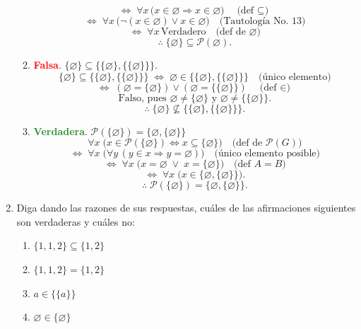 \documentclass[12pt,letterpaper]{exam}
\begin{document}
\begin{enumerate}
\begin{enumerate}[label=\alph*)]
\[\iff\; \forall x\,\big(x\in\varnothing \Rightarrow x\in \varnothing\big)
\quad\text{(def $\subseteq$)}
\]
\[
\iff\; \forall x\,\big(\lnot(x\in\varnothing)\lor x\in \varnothing\big)
\quad\text{(Tautología No.\ 13)}
\]
\[
\iff\; \forall x\,\text{Verdadero}
\quad\text{(def de $\varnothing$)}
\]
\[
\therefore\; \{\varnothing\}\subseteq \mathcal{P}(\varnothing).
\]
\item \textbf{\textcolor{red}{Falsa}}. $\{\varnothing\} \subseteq \{\{\varnothing\}, \{\{\varnothing\}\}\}$.
\[
\{\varnothing\}\subseteq \{\{\varnothing\}, \{\{\varnothing\}\}\}
\;\iff\; \varnothing\in \{\{\varnothing\}, \{\{\varnothing\}\}\} \quad\text{(\'unico elemento)}
\]
\[
\iff\; (\varnothing=\{\varnothing\}) \lor (\varnothing=\{\{\varnothing\}\}) \quad\text{(def $\in$)}
\]
\[
\text{Falso, pues } \varnothing\neq\{\varnothing\} \text{ y } \varnothing\neq\{\{\varnothing\}\}.
\]
\[
\therefore\; \{\varnothing\}\not\subseteq \{\{\varnothing\}, \{\{\varnothing\}\}\}.
\]
\item \textbf{\textcolor{ForestGreen}{Verdadera}}. $\mathcal{P}(\{\varnothing\}) = \{\varnothing, \{\varnothing\}\}$
\[
\forall x\;\Big(x\in\mathcal{P}(\{\varnothing\})
\iff x\subseteq \{\varnothing\}\Big) \quad\text{(def de $\mathcal{P}(G)$)}
\]
\[
\iff\; \forall x\;\Big(\forall y\,(y\in x \Rightarrow y=\varnothing)\Big)
\quad\text{(\'unico elemento posible)}
\]
\[
\iff\; \forall x\;\big(x=\varnothing \;\lor\; x=\{\varnothing\}\big)
\quad\text{(def $A=B$)}
\]
\[
\iff\; \forall x\;\big(x\in \{\varnothing,\{\varnothing\}\}\big).
\]
\[
\therefore\; \mathcal{P}(\{\varnothing\})=\{\varnothing,\{\varnothing\}\}.
\]

\end{enumerate}




    
    \item  Diga dando las razones de sus respuestas, cuáles de las afirmaciones siguientes son verdaderas y cuáles no:
    \begin{enumerate}[label=\alph*)]
        \item $\{1,1,2\} \subseteq \{1,2\}$
        \item $\{1,1,2\} = \{1,2\}$
        \item $a \in \{\{a\}\}$
        \item $\varnothing \in \{\varnothing\}$
    \end{enumerate}


\end{enumerate}
\end{document}
